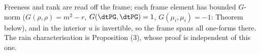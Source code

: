 Freeness and rank are read off the frame; each frame element has bounded $G$-norm ($G(\rho,\rho) = m^2 - r$, $G(\dtPG,\dtPG) = 1$, $G(\mu_i,\mu_i) = -1$: Theorem  below), and in the interior $u$ is invertible, so the frame spans all one-forms there. The rain characterisation is Proposition (3), whose proof is independent of this one.
